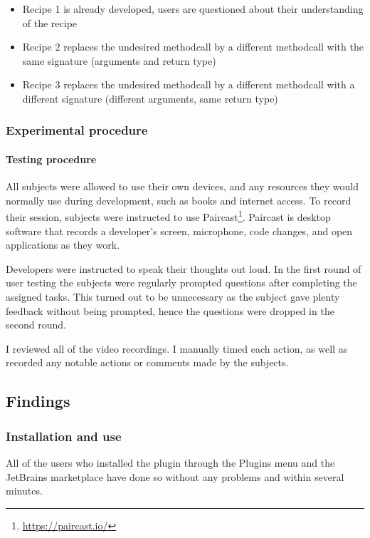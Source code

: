 \begin{itemize}[noitemsep]
    \item Recipe 1 is already developed, users are questioned about their understanding of the recipe
    \item Recipe 2 replaces the undesired methodcall by a different methodcall with the same signature (arguments and return type)
    \item Recipe 3 replaces the undesired methodcall by a different methodcall with a different signature (different arguments, same return type)
\end{itemize}

\subsubsection{Experimental procedure}
\paragraph{Testing procedure}
All subjects were allowed to use their own devices, and any resources they would normally use during development, such as books and internet access. To record their session, subjects were instructed to use Paircast\footnote{\url{https://paircast.io/}}.
Paircast is desktop software that records a developer's screen, microphone, code changes, and open applications as they work.

Developers were instructed to speak their thoughts out loud.
In the first round of user testing the subjects were regularly prompted questions after completing the assigned tasks.
This turned out to be unnecessary as the subject gave plenty feedback without being prompted, hence the questions were dropped in the second round.

I reviewed all of the video recordings.
I manually timed each action, as well as recorded any notable actions or comments made by the subjects.

\subsection{Findings}
\subsubsection{Installation and use}
All of the users who installed the plugin through the Plugins menu and the JetBrains marketplace have done so without any problems and within several minutes.

